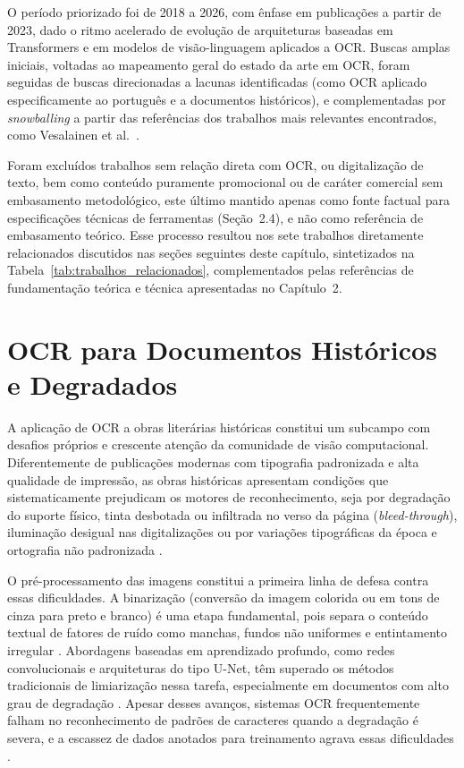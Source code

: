 \documentclass[
  12pt,
  oneside,
  a4paper,
  chapter=TITLE,
  section=TITLE,
  english,
  brazil
]{abntex2}
\begin{document}
O período priorizado foi de 2018 a 2026, com ênfase em publicações a partir de 2023,
dado o ritmo acelerado de evolução de arquiteturas baseadas em Transformers e em modelos
de visão-linguagem aplicados a OCR. Buscas amplas iniciais, voltadas ao mapeamento geral do
estado da arte em OCR, foram seguidas de buscas direcionadas a lacunas identificadas
(como OCR aplicado especificamente ao português e a documentos históricos), e
complementadas por \textit{snowballing} a partir das referências dos trabalhos mais
relevantes encontrados, como Vesalainen et al.\ \cite{vesalainen2025}.

Foram excluídos trabalhos
sem relação direta com OCR, ou digitalização de texto, bem como conteúdo puramente
promocional ou de caráter comercial sem embasamento metodológico, este último mantido
apenas como fonte factual para especificações técnicas de ferramentas (Seção~2.4), e não
como referência de embasamento teórico. Esse processo resultou nos sete trabalhos
diretamente relacionados discutidos nas seções seguintes deste capítulo, sintetizados na
Tabela~\ref{tab:trabalhos_relacionados}, complementados pelas referências de
fundamentação teórica e técnica apresentadas no Capítulo~2.

\section{OCR para Documentos Históricos e Degradados}
\label{sec:ocr_historico}

A aplicação de OCR a obras literárias históricas constitui um subcampo com desafios
próprios e crescente atenção da comunidade de visão computacional. Diferentemente de
publicações modernas com tipografia padronizada e alta qualidade de impressão, as obras
históricas apresentam condições que sistematicamente prejudicam os motores de
reconhecimento, seja por degradação do suporte físico, tinta desbotada ou infiltrada no
verso da página (\textit{bleed-through}), iluminação desigual nas digitalizações ou por
variações tipográficas da época e ortografia não padronizada \cite{lombardi2020}.

O pré-processamento das imagens constitui a primeira linha de defesa contra essas
dificuldades. A binarização (conversão da imagem colorida ou em tons de cinza para
preto e branco) é uma etapa fundamental, pois separa o conteúdo textual de fatores de
ruído como manchas, fundos não uniformes e entintamento irregular \cite{lombardi2020}.
Abordagens baseadas em aprendizado profundo, como redes convolucionais e arquiteturas do
tipo U-Net, têm superado os métodos tradicionais de limiarização nessa tarefa,
especialmente em documentos com alto grau de degradação \cite{anvari2021}. Apesar desses
avanços, sistemas OCR frequentemente falham no reconhecimento de padrões de caracteres
quando a degradação é severa, e a escassez de dados anotados para treinamento agrava
essas dificuldades \cite{lombardi2020}.
\end{document}
